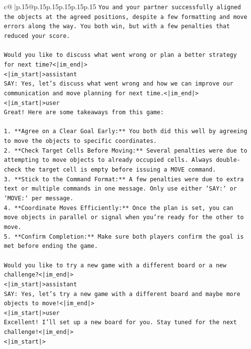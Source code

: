 \documentclass{article}
\begin{document}
{\begin{supertabular}{c@{$\;$}|p{.15\linewidth}@{}p{.15\linewidth}p{.15\linewidth}p{.15\linewidth}p{.15\linewidth}p{.15\linewidth}}
{{{\texttt{You and your partner successfully aligned the objects at the agreed positions, despite a few formatting and move errors along the way. You both win, but with a few penalties that reduced your score.} \\
\\ 
\texttt{Would you like to discuss what went wrong or plan a better strategy for next time?<|im\_end|>} \\
\texttt{<|im\_start|>assistant} \\
\texttt{SAY: Yes, let's discuss what went wrong and how we can improve our communication and move planning for next time.<|im\_end|>} \\
\texttt{<|im\_start|>user} \\
\texttt{Great! Here are some takeaways from this game:} \\
\\ 
\texttt{1. **Agree on a Clear Goal Early:** You both did this well by agreeing to move the objects to specific coordinates.} \\
\texttt{2. **Check Target Cells Before Moving:** Several penalties were due to attempting to move objects to already occupied cells. Always double{-}check the target cell is empty before issuing a MOVE command.} \\
\texttt{3. **Stick to the Command Format:** A few penalties were due to extra text or multiple commands in one message. Only use either `SAY:` or `MOVE:` per message.} \\
\texttt{4. **Coordinate Moves Efficiently:** Once the plan is set, you can move objects in parallel or signal when you're ready for the other to move.} \\
\texttt{5. **Confirm Completion:** Make sure both players confirm the goal is met before ending the game.} \\
\\ 
\texttt{Would you like to try a new game with a different board or a new challenge?<|im\_end|>} \\
\texttt{<|im\_start|>assistant} \\
\texttt{SAY: Yes, let's try a new game with a different board and maybe more objects to move!<|im\_end|>} \\
\texttt{<|im\_start|>user} \\
\texttt{Excellent! I'll set up a new board for you. Stay tuned for the next challenge!<|im\_end|>} \\
\texttt{<|im\_start|>} \\
            }
        }
    }
     \\ \\


\end{supertabular}}
\end{document}
